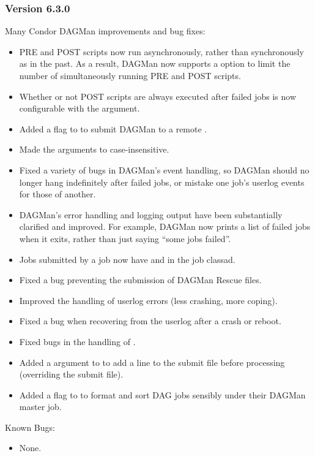 \subsubsection{\label{sec:New-6-3-0}Version 6.3.0}

\noident
Many Condor DAGMan improvements and bug fixes:

\begin{itemize}

\item
PRE and POST scripts now run asynchronously, rather than synchronously
as in the past.  As a result, DAGMan now supports a 
option to limit the number of simultaneously running PRE and POST
scripts.

\item
Whether or not POST scripts are always executed after failed jobs is
now configurable with the  argument.

\item
Added a  flag to  to submit DAGMan to a
remote .

\item
Made the arguments to  case-insensitive.

\item
Fixed a variety of bugs in DAGMan's event handling, so DAGMan should
no longer hang indefinitely after failed jobs, or mistake one job's
userlog events for those of another.

\item
DAGMan's error handling and logging output have been substantially
clarified and improved.  For example, DAGMan now prints a list of
failed jobs when it exits, rather than just saying ``some jobs
failed''.

\item
Jobs submitted by a  job now have 
and  in the job classad.

\item
Fixed a  bug preventing the submission of DAGMan
Rescue files.

\item
Improved the handling of userlog errors (less crashing, more coping).

\item
Fixed a bug when recovering from the userlog after a crash or reboot.

\item
Fixed bugs in the handling of .

\item
Added a  argument to  to add a line to the
submit file before processing (overriding the submit file).

\item
Added a  flag to  to format and sort DAG jobs
sensibly under their DAGMan master job.

\end{itemize}

\noindent Known Bugs:

\begin{itemize}

\item None.

\end{itemize}
